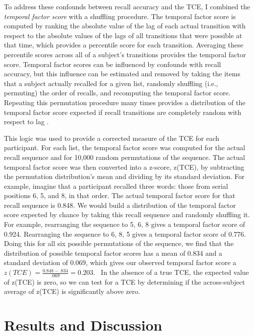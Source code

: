 \documentclass[man,natbib,floatsintext]{apa6} %
\begin{document}
To address these confounds between recall accuracy and the TCE, I combined the \emph{temporal factor score} \citep{SedeEtal10,PolyEtal09} with a shuffling procedure. The temporal factor score is computed by ranking the absolute value of the lag of each actual transition with respect to the absolute values of the lags of all transitions that were possible at that time, which provides a percentile score for each transition. Averaging these percentile scores across all of a subject's transitions provides the temporal factor score.
Temporal factor scores can be influenced by confounds with recall accuracy, but this influence can be estimated and removed by taking the items that a subject actually recalled for a given list, randomly shuffling (i.e., permuting) the order of recalls, and recomputing the temporal factor score. Repeating this permutation procedure many times provides a distribution of the temporal factor score expected if recall transitions are completely random with respect to lag \citep{HealKaha17}. 

This logic was used to provide a corrected measure of the TCE for each participant. For each list, the temporal factor score was computed for the actual recall sequence and for 10,000 random permutations of the sequence. The actual temporal factor score was then converted into a z-score, z(TCE), by subtracting the permutation distribution's mean and dividing by its standard deviation. For example, imagine that a participant recalled three words: those from serial positions 6, 5, and 8, in that order. The actual temporal factor score for that recall sequence is 0.848. We would build a distribution of the temporal factor score expected by chance by taking this recall sequence and randomly shuffling it. For example, rearranging the sequence to 5, 6, 8 gives a temporal factor score of 0.924. Rearranging the sequence to 6, 8, 5 gives a temporal factor score of 0.776. Doing this for all six possible permutations of the sequence, we find that the distribution of possible temporal factor scores has a mean of 0.834 and a standard deviation of 0.069, which gives our observed temporal factor score a $z(TCE)=\frac{0.848-.834}{.069}=0.203$. ~In the absence of a true TCE, the expected value of z(TCE) is zero, so we can test for a TCE by determining if the across-subject average of z(TCE) is significantly above zero. 

\section{Results and Discussion}
\end{document}
